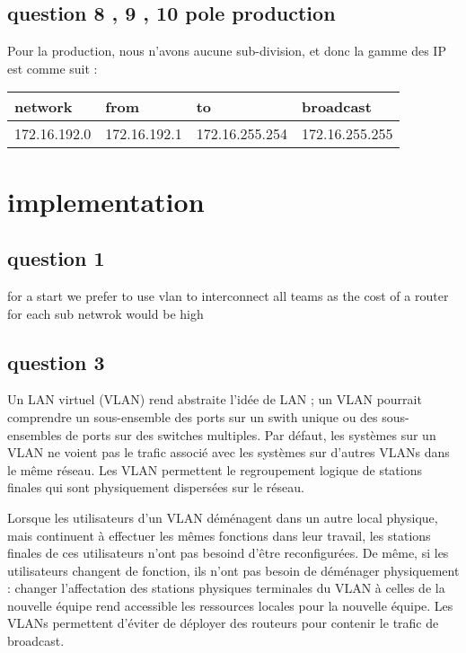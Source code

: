 \documentclass[11pt]{article}
\begin{document}
\subsection{question 8 , 9 , 10 pole production}
\label{sec:orgheadline16}

Pour la production, nous n'avons aucune sub-division, et donc la gamme des
IP est comme suit :


\begin{center}
\begin{tabular}{|l|l|l|l|}
\hline
network & from & to & broadcast \\
\hline
172.16.192.0 & 172.16.192.1 & 172.16.255.254 & 172.16.255.255 \\
\hline
\end{tabular}
\end{center}

\section{implementation}
\label{sec:orgheadline46}

\subsection{question 1}
\label{sec:orgheadline18}
for a start we prefer to use vlan to interconnect all teams as the cost of a router for each sub netwrok would be high

\subsection{question 3}
\label{sec:orgheadline19}

Un LAN virtuel (VLAN) rend abstraite l'idée de LAN ; un VLAN pourrait comprendre un sous-ensemble des ports sur un swith unique ou des sous-ensembles
de ports sur des switches multiples. Par défaut, les systèmes sur un VLAN ne voient pas le trafic associé avec les systèmes sur d'autres VLANs dans le
même réseau.
Les VLAN permettent le regroupement logique de stations finales qui sont physiquement dispersées sur le réseau.



Lorsque les utilisateurs d'un VLAN déménagent dans un autre local physique, mais continuent à effectuer les mêmes fonctions dans leur travail, les stations
finales de ces utilisateurs n'ont pas besoind d'être reconfigurées. De même, si les utilisateurs changent de fonction, ils n'ont pas besoin de déménager
physiquement : changer l'affectation des stations physiques terminales du VLAN à celles de la nouvelle équipe rend accessible les ressources
locales pour la nouvelle équipe.
Les VLANs permettent d'éviter de déployer des routeurs pour contenir le trafic de broadcast.
\end{document}
